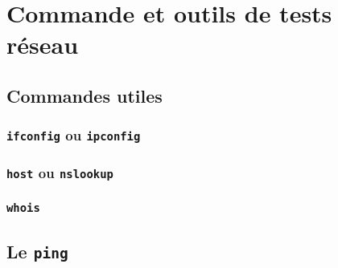 \documentclass[a4paper, 11pt]{article}
\begin{document}
	\maketitle
	\section{Commande et outils de tests réseau}
	\subsection{Commandes utiles}
	\subsubsection{\texttt{ifconfig} ou \texttt{ipconfig}}
	\subsubsection{\texttt{host} ou \texttt{nslookup}}
	\subsubsection{\texttt{whois}}
	\subsection{Le \texttt{ping}}
\end{document}
